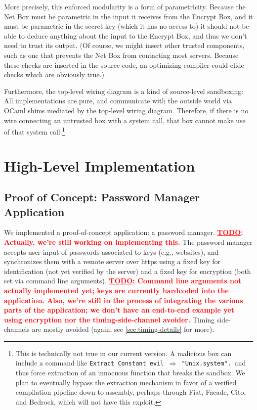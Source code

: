 \documentclass{article}
\newcommand{\todo}[1]{\textbf{\textcolor{red}{\underline{TODO}: #1}}}
\begin{document}
More precisely, this enforced modularity is a form of parametricity.  Because the Net Box must be parametric in the input it receives from the Encrypt Box, and it must be parametric in the secret key (which it has no access to) it should not be able to deduce anything about the input to the Encrypt Box, and thus we don't need to trust its output.  (Of course, we might insert other trusted components, such as one that prevents the Net Box from contacting most servers.  Because these checks are inserted in the source code, an optimizing compiler could elide checks which are obviously true.)

Furthermore, the top-level wiring diagram is a kind of source-level sandboxing:  All implementations are pure, and communicate with the outside world via OCaml shims mediated by the top-level wiring diagram.  Therefore, if there is no wire connecting an untrusted box with a system call, that box cannot make use of that system call.\footnote{This is technically not true in our current version.  A malicious box can include a command like \texttt{Extract Constant evil $\Rightarrow$ "Unix.system".}~and thus force extraction of an innocuous function that breaks the sandbox.  We plan to eventually bypass the extraction mechanism in favor of a verified compilation pipeline down to assembly, perhaps through Fiat, Facade, Cito, and Bedrock, which will not have this exploit.}

\section{High-Level Implementation}
\subsection{Proof of Concept: Password Manager Application}
We implemented a proof-of-concept application: a password manager. \todo{Actually, we're still working on implementing this.}  The password manager accepts user-input of passwords associated to keys (e.g., websites), and synchronizes them with a remote server over https using a fixed key for identification (not yet verified by the server) and a fixed key for encryption (both set via command line arguments). \todo{Command line arguments not actually implemented yet; keys are currently hardcoded into the application.  Also, we're still in the process of integrating the various parts of the application; we don't have an end-to-end example yet using encryption nor the timing-side-channel avoider.}  Timing side-channels are mostly avoided (again, see \autoref{sec:timing-details} for more).
\end{document}
